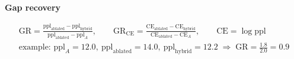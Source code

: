 \documentclass[border=40pt]{standalone}
\begin{document}
\begin{minipage}{26cm}
{\sffamily\bfseries\Large\color{muted} Gap recovery}\par\vspace{-14pt}
{\LARGE
\begin{gather*}
\mathrm{GR} = \frac{\mathrm{ppl}_{\mathrm{ablated}} - \mathrm{ppl}_{\mathrm{hybrid}}}{\mathrm{ppl}_{\mathrm{ablated}} - \mathrm{ppl}_{A}},
\qquad
\mathrm{GR}_{\mathrm{CE}} = \frac{\mathrm{CE}_{\mathrm{ablated}} - \mathrm{CE}_{\mathrm{hybrid}}}{\mathrm{CE}_{\mathrm{ablated}} - \mathrm{CE}_{A}},
\qquad \mathrm{CE} = \log \mathrm{ppl}
\\[6pt]
\text{example: } \mathrm{ppl}_A = 12.0,\ \mathrm{ppl}_{\mathrm{ablated}} = 14.0,\ \mathrm{ppl}_{\mathrm{hybrid}} = 12.2
\;\Rightarrow\; \mathrm{GR} = \frac{1.8}{2.0} = 0.9
\end{gather*}}
\end{minipage}
\end{document}
